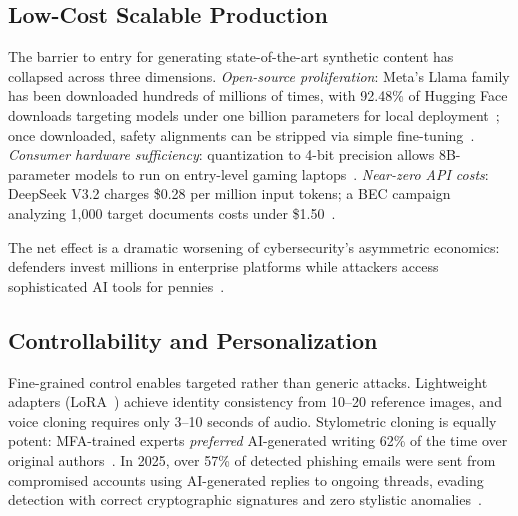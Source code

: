 \subsection{Low-Cost Scalable Production}
\label{sec:cap-scale}

The barrier to entry for generating state-of-the-art synthetic content has collapsed across three dimensions. \emph{Open-source proliferation}: Meta's Llama family has been downloaded hundreds of millions of times, with 92.48\% of Hugging Face downloads targeting models under one billion parameters for local deployment~\cite{llama3,hfstats2025}; once downloaded, safety alignments can be stripped via simple fine-tuning~\cite{aisafetyreport2025}. \emph{Consumer hardware sufficiency}: quantization to 4-bit precision allows 8B-parameter models to run on entry-level gaming laptops~\cite{localai2026}. \emph{Near-zero API costs}: DeepSeek V3.2 charges \$0.28 per million input tokens; a BEC campaign analyzing 1,000 target documents costs under \$1.50~\cite{tldl2026pricing}.

The net effect is a dramatic worsening of cybersecurity's asymmetric economics: defenders invest millions in enterprise platforms while attackers access sophisticated AI tools for pennies~\cite{zensec2025phishing}.


\subsection{Controllability and Personalization}
\label{sec:cap-control}

Fine-grained control enables targeted rather than generic attacks. Lightweight adapters (LoRA~\cite{hu2022lora}) achieve identity consistency from 10--20 reference images, and voice cloning requires only 3--10 seconds of audio. Stylometric cloning is equally potent: MFA-trained experts \emph{preferred} AI-generated writing 62\% of the time over original authors~\cite{chi2026creative}. In 2025, over 57\% of detected phishing emails were sent from compromised accounts using AI-generated replies to ongoing threads, evading detection with correct cryptographic signatures and zero stylistic anomalies~\cite{zensec2025phishing}.


